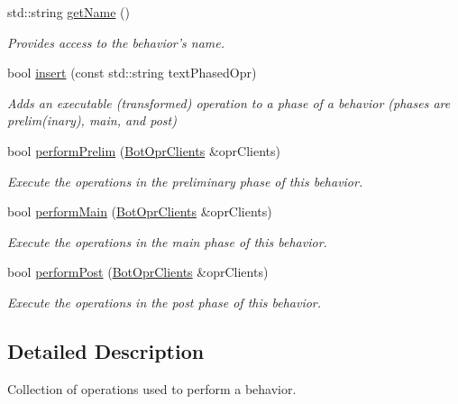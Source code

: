 \begin{DoxyCompactItemize}
\item 
std\-::string \hyperlink{classBotBehavior_a7a79661c4afeab6fee0388fe84c6c45a}{get\-Name} ()
\begin{DoxyCompactList}\small\item\em Provides access to the behavior's name. \end{DoxyCompactList}\item 
bool \hyperlink{classBotBehavior_a2814c74acdbb8e527b24d67de90d393d}{insert} (const std\-::string text\-Phased\-Opr)
\begin{DoxyCompactList}\small\item\em Adds an executable (transformed) operation to a phase of a behavior (phases are prelim(inary), main, and post) \end{DoxyCompactList}\item 
bool \hyperlink{classBotBehavior_aebab943aa7ebb3a8ea540d8eccf929e3}{perform\-Prelim} (\hyperlink{classBotOprClients}{Bot\-Opr\-Clients} \&opr\-Clients)
\begin{DoxyCompactList}\small\item\em Execute the operations in the preliminary phase of this behavior. \end{DoxyCompactList}\item 
bool \hyperlink{classBotBehavior_add170f17aa5aa70014bb5dd23d1f0f50}{perform\-Main} (\hyperlink{classBotOprClients}{Bot\-Opr\-Clients} \&opr\-Clients)
\begin{DoxyCompactList}\small\item\em Execute the operations in the main phase of this behavior. \end{DoxyCompactList}\item 
bool \hyperlink{classBotBehavior_a6326a763ff29158e41201b2957004b9b}{perform\-Post} (\hyperlink{classBotOprClients}{Bot\-Opr\-Clients} \&opr\-Clients)
\begin{DoxyCompactList}\small\item\em Execute the operations in the post phase of this behavior. \end{DoxyCompactList}\end{DoxyCompactItemize}


\subsection{Detailed Description}
Collection of operations used to perform a behavior. 

